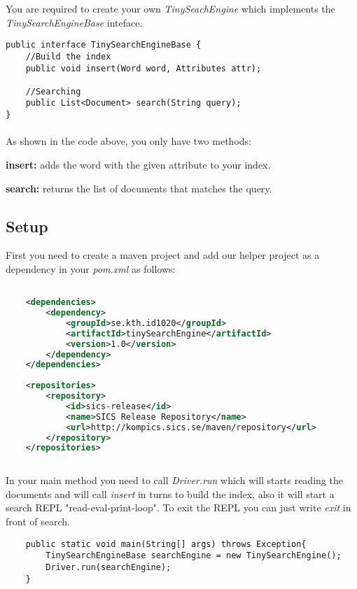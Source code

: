 \documentclass[11pt]{article}
\begin{document}
You are required to create your own \textit{TinySeachEngine} which implements the \textit{TinySearchEngineBase} inteface.

\begin{lstlisting}
public interface TinySearchEngineBase {
    //Build the index
    public void insert(Word word, Attributes attr);
        
    //Searching
    public List<Document> search(String query);
}
\end{lstlisting}

\paragraph{}
As shown in the code above, you only have two methods:
\begin{description}
\item \textbf{insert:} adds the word with the given attribute to your index.
\item \textbf{search:} returns the list of documents that matches the query.
\end{description}

\newpage
\subsection{Setup}
First you need to create a maven project and add our helper project as a dependency in your \textit{pom.xml} as follows:

\begin{lstlisting}[language=XML]

    <dependencies>
        <dependency>
            <groupId>se.kth.id1020</groupId>
            <artifactId>tinySearchEngine</artifactId>
            <version>1.0</version>
        </dependency>
    </dependencies>
    
    <repositories>
        <repository>
            <id>sics-release</id>
            <name>SICS Release Repository</name>
            <url>http://kompics.sics.se/maven/repository</url>
        </repository>
    </repositories>
    
\end{lstlisting}

In your main method you need to call \textit{Driver.run} which will starts reading the documents and will call \textit{insert} in turns to build the index, also it will start a  search REPL "read-eval-print-loop". To exit the REPL you can just write \textit{exit} in front of search.

\begin{lstlisting}
    public static void main(String[] args) throws Exception{
        TinySearchEngineBase searchEngine = new TinySearchEngine();
        Driver.run(searchEngine);
    }
\end{lstlisting}
\end{document}
